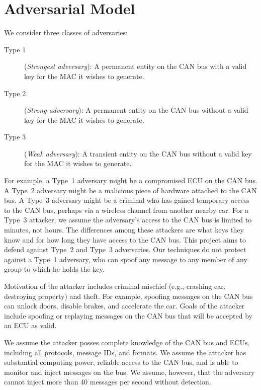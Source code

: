 \section{Adversarial Model}
\label{adversary}

We consider three classes of adversaries:

\begin{description}

	\item [Type 1]
	(\textit{Strongest adversary}): A permanent entity on the CAN bus with a valid key for the MAC it wishes to generate.
	
	\item [Type 2]
	(\textit{Strong adversary}): A permanent entity on the CAN bus without a valid key for the MAC it wishes to generate.
	
	\item [Type 3]
	(\textit{Weak adversary}): A transient entity on the CAN bus without a valid key for the MAC it wishes to generate.
	
\end{description}

For example, a Type~1 adversary might be a compromised ECU on the CAN bus.  A Type~2 adversary might be a malicious piece of hardware attached
to the CAN bus.  A Type~3 adversary might be a criminal who has gained temporary access to the CAN bus, perhaps via a wireless channel from
another nearby car.  For a Type~3 attacker, we assume the adversary's access to the CAN bus is limited to minutes, not hours.  
The differences among these attackers are what keys they know and for how long they have access to the CAN bus.
This project aims to defend against Type~2 and Type~3 adversaries.   Our techniques do not protect against 
a Type~1 adversary, who can spoof any message to any member of any group to which he holds the key. 

Motivation of the attacker includes criminal mischief (e.g., crashing car, destroying property) and theft.  
For example, spoofing messages on the CAN bus can unlock doors, disable brakes, and accelerate the car.
Goals of the attacker include spoofing or replaying messages on the CAN bus that will be accepted by an ECU
as valid.

We assume the attacker posses complete knowledge of the CAN bus and ECUs, including all protocols, message IDs, and formats.
We assume the attacker has substantial computing power, reliable access to the CAN bus, and is able to 
monitor and inject messages on the bus.  We assume, however, that the adversary cannot inject more than 40 messages
per second without detection.

